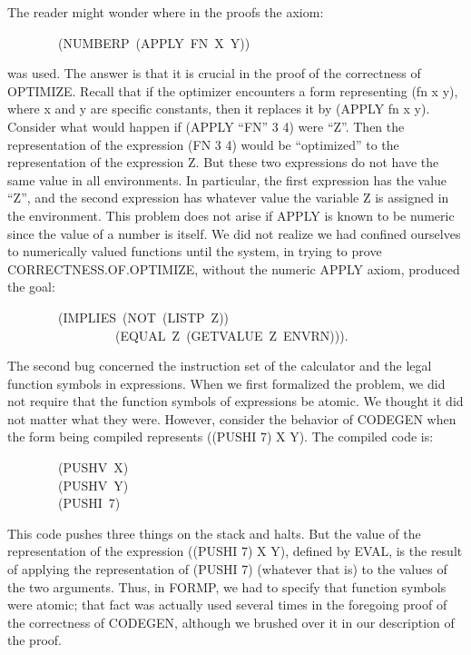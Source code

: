 \documentclass[11pt]{book}
\newenvironment{pubasis}{\begin{flushleft}\ttfamily\small}{\normalsize\rmfamily\end{flushleft}}
\begin{document}
The reader might wonder where in the proofs the axiom:
\begin{pubasis}
~~~~~~~~(NUMBERP~(APPLY~FN~X~Y))\\
\end{pubasis}
was used.  The answer is that it is crucial in 
the proof of the correctness of OPTIMIZE.
Recall that if the optimizer encounters a form representing (fn x y),
where x and y are specific constants, then it replaces it by (APPLY fn x y).
Consider what would happen if (APPLY ``FN'' 3 4) were ``Z''.  Then the representation
of the
expression (FN 3 4) would be ``optimized'' to the representation of the expression Z.  But these
two expressions do not have the same value in all environments.
In particular, the first expression has the value ``Z'', and the second
expression has whatever value the variable Z is assigned in the environment.
This problem does not arise if APPLY is known to be numeric
since the value of a number is itself.
We did not realize we had confined ourselves to numerically valued functions
until the system, in trying to prove CORRECT\-NESS.OF.OPTIMIZE, without the
numeric APPLY axiom, produced
the goal:
\begin{pubasis}
~~~~~~~~(IMPLIES~(NOT~(LISTP~Z))\\
~~~~~~~~~~~~~~~~~(EQUAL~Z~(GETVALUE~Z~ENVRN))).\\
\end{pubasis}
The second bug concerned the instruction set of the calculator and the
legal function symbols in expressions.  When we first formalized the
problem, we did not require that the function symbols of expressions
be atomic.  We thought it did not matter what they were.  However,
consider the behavior of CODEGEN when the form
being compiled represents ((PUSHI 7) X Y).  The
compiled code is:
\begin{pubasis}
~~~~~~~~(PUSHV~X)\\
~~~~~~~~(PUSHV~Y)\\
~~~~~~~~(PUSHI~7)\\
\end{pubasis}
This code   pushes three things on the stack and halts.
But the value of the representation of the expression
((PUSHI 7) X Y), defined by EVAL, is  
the result of applying the representation of (PUSHI 7) (whatever that is) to the values of the two arguments.
Thus, in FORMP, we had to specify that function symbols
were atomic; that fact was actually used several times in the
foregoing proof of the
correctness of CODEGEN, although we brushed over it in our
description of the proof.
\end{document}
